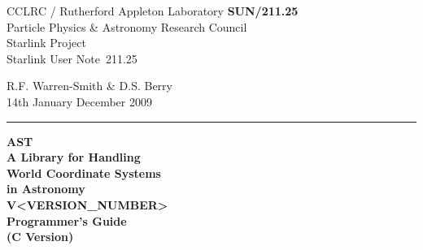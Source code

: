 \documentclass[twoside,11pt]{article}
\newcommand{\stardoccategory}  {Starlink User Note}
\newcommand{\stardocinitials}  {SUN}
\newcommand{\stardocnumber}    {211.25}
\newcommand{\stardocnumber}    {210.25}
\newcommand{\stardocauthors}   {R.F. Warren-Smith \& D.S. Berry}
\newcommand{\stardocdate}      {14th January December 2009}
\newcommand{\stardoctitle}     {AST\\
                                A Library for Handling\\
                                World Coordinate Systems\\
                                in Astronomy}
\newcommand{\stardocversion}   {V<VERSION_NUMBER>}
\newcommand{\stardocmanual}    {Programmer's Guide\\(C Version)}
\newcommand{\stardocmanual}    {Programmer's Guide\\(Fortran Version)}
\newcommand{\stardocname}{\stardocinitials /\stardocnumber}
\newenvironment{latexonly}{}{}
\begin{document}
\thispagestyle{empty}

\begin{latexonly}
   CCLRC / {\sc Rutherford Appleton Laboratory} \hfill {\bf \stardocname}\\
   {\large Particle Physics \& Astronomy Research Council}\\
   {\large Starlink Project\\}
   {\large \stardoccategory\ \stardocnumber}
   \begin{flushright}
   \stardocauthors\\
   \stardocdate
   \end{flushright}
   \vspace{-4mm}
   \rule{\textwidth}{0.5mm}
   \vspace{-7mm}
   \begin{center}
   {\Huge\bf  \stardoctitle \\ [2.0ex]}
   {\LARGE\bf \stardocversion \\ [1.0ex]}
   {\Huge\bf  \stardocmanual}
   \end{center}


\end{latexonly}
\end{document}

